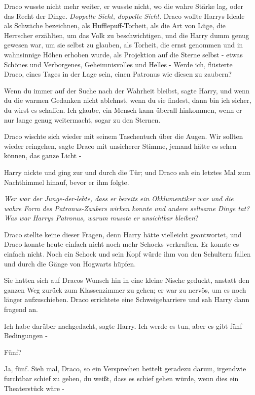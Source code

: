 Draco wusste nicht mehr weiter, er wusste nicht, wo die wahre Stärke lag, oder
das Recht der Dinge. \emph{Doppelte Sicht, doppelte Sicht.} Draco wollte Harrys
Ideale als Schwäche bezeichnen, als Hufflepuff-Torheit, als die Art von Lüge,
die Herrscher erzählten, um das Volk zu beschwichtigen, und die Harry dumm genug
gewesen war, um sie selbst zu glauben, als Torheit, die ernst genommen und in
wahnsinnige Höhen erhoben wurde, als Projektion auf die Sterne selbst - etwas
Schönes und Verborgenes, Geheimnisvolles und Helles - \glqq Werde ich\grqq{},
flüsterte Draco, \glqq eines Tages in der Lage sein, einen Patronus wie diesen
zu zaubern?\grqq{}

\glqq Wenn du immer auf der Suche nach der Wahrheit bleibst\grqq{}, sagte Harry,
\glqq und wenn du die warmen Gedanken nicht ablehnst, wenn du sie findest, dann
bin ich sicher, du wirst es schaffen. Ich glaube, ein Mensch kann überall
hinkommen, wenn er nur lange genug weitermacht, sogar zu den Sternen.\grqq{}

Draco wischte sich wieder mit seinem Taschentuch über die Augen. \glqq Wir
sollten wieder reingehen\grqq{}, sagte Draco mit unsicherer Stimme, \glqq jemand
hätte es sehen können, das ganze Licht -\grqq{}

Harry nickte und ging zur und durch die Tür; und Draco sah ein letztes Mal zum
Nachthimmel hinauf, bevor er ihm folgte.

\emph{Wer war der Junge-der-lebte, dass er bereits ein Okklumentiker war und die
wahre Form des Patronus-Zaubers wirken konnte und andere seltsame Dinge tat? Was
war Harrys Patronus, warum musste er unsichtbar bleiben}?

Draco stellte keine dieser Fragen, denn Harry hätte vielleicht geantwortet, und
Draco konnte heute einfach nicht noch mehr Schocks verkraften. Er konnte es
einfach nicht. Noch ein Schock und sein Kopf würde ihm von den Schultern fallen
und durch die Gänge von Hogwarts hüpfen.

Sie hatten sich auf Dracos Wunsch hin in eine kleine Nische geduckt, anstatt den
ganzen Weg zurück zum Klassenzimmer zu gehen; er war zu nervös, um es noch
länger aufzuschieben. Draco errichtete eine Schweigebarriere und sah Harry dann
fragend an.

\glqq Ich habe darüber nachgedacht\grqq{}, sagte Harry. \glqq Ich werde es tun,
aber es gibt fünf Bedingungen -\grqq{}

\glqq Fünf?\grqq{}

\glqq Ja, fünf. Sieh mal, Draco, so ein Versprechen bettelt geradezu darum,
irgendwie furchtbar schief zu gehen, du weißt, dass es schief gehen würde, wenn
dies ein Theaterstück wäre -\grqq{}

